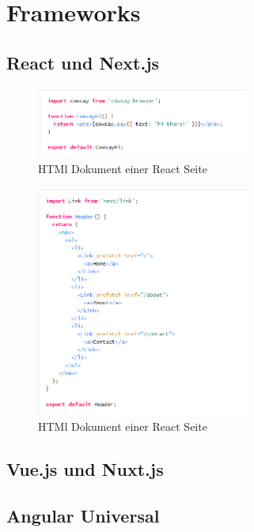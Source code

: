 \documentclass[runningheads]{llncs}
\begin{document}
\newpage

\section{Frameworks}
\label{sec:Evaluation}

\subsection{React und Next.js}
\label{subsec:React und Next.js}

\begin{figure}
  \centering
  \includegraphics[width=7cm]{images/CodeSplitting}
  \caption{HTMl Dokument einer React Seite}
\end{figure}

\begin{figure}
  \centering
  \includegraphics[width=7cm]{images/prefetchnext}
  \caption{HTMl Dokument einer React Seite}
\end{figure}


\subsection{Vue.js und Nuxt.js}
\label{subsec:Vue.js und Nuxt.js}

\subsection{Angular Universal}
\label{subsec:Angular Universal}
\end{document}
